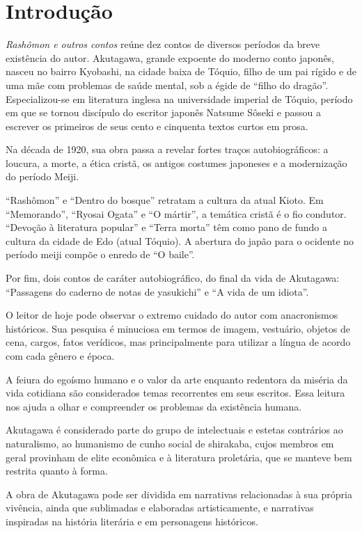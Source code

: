 \documentclass[12pt]{extarticle}
\begin{document}
\tableofcontents

\section{Introdução}

\textit{Rashômon e outros contos} reúne dez contos de diversos períodos da breve
existência do autor. Akutagawa, grande expoente do moderno conto japonês, nasceu no bairro
Kyobashi, na cidade baixa de Tóquio, filho de um pai rígido e de uma mãe com problemas
de saúde mental, sob a égide de “filho do dragão''. Especializou-se em 
literatura inglesa na universidade imperial de Tóquio,
período em que se tornou discípulo do escritor japonês Natsume Sôseki e passou
a escrever os primeiros de seus cento e cinquenta textos curtos em prosa.
 
Na década de 1920, sua obra passa a revelar fortes traços
autobiográficos: a loucura, a morte, a ética cristã, os antigos costumes
japoneses e a modernização do período Meiji. 

“Rashômon” e “Dentro do bosque” retratam a cultura da atual Kioto. Em
“Memorando”, “Ryosai Ogata'' e “O mártir”, a temática cristã é o fio
condutor. “Devoção à literatura popular” e “Terra morta” têm como pano de fundo a cultura
da cidade de Edo (atual Tóquio). A abertura do japão para o ocidente no período meiji
compõe o enredo de “O baile”.
 
Por fim, dois contos de caráter autobiográfico, do final da vida de
Akutagawa: “Passagens do caderno de notas de yasukichi” e “A vida de um
idiota”.

O leitor de hoje pode observar o extremo cuidado do autor com anacronismos
históricos. Sua pesquisa é minuciosa em termos de imagem, vestuário, objetos
de cena, cargos, fatos verídicos, mas principalmente para utilizar a língua
de acordo com cada gênero e época.
 
A feiura do egoísmo humano e o valor da arte enquanto redentora da miséria da
vida cotidiana são considerados temas recorrentes em seus escritos.
Essa leitura nos ajuda a olhar e compreender os problemas da existência humana.
 
Akutagawa é considerado parte do grupo de intelectuais e estetas contrários ao
naturalismo, ao humanismo de cunho social de shirakaba, cujos membros em
geral provinham de elite econômica e à literatura proletária, que se manteve
bem restrita quanto à forma.
 
A obra de Akutagawa pode ser dividida em narrativas relacionadas à sua própria
vivência, ainda que sublimadas e elaboradas artisticamente, e narrativas
inspiradas na história literária e em personagens históricos.
 
\end{document}
